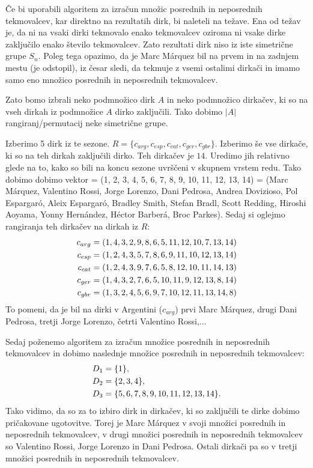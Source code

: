 \documentclass[a4paper, 12pt]{book}
\begin{document}
Če bi uporabili algoritem za izračun množic posrednih in neposrednih tekmovalcev, kar direktno na rezultatih dirk, bi naleteli na težave. Ena od težav je, da ni na vsaki dirki tekmovalo enako tekmovalcev oziroma ni vsake dirke zaključilo enako število tekmovalcev. Zato rezultati dirk niso iz iste simetrične grupe $S_n$. Poleg tega opazimo, da je Marc Márquez bil na prvem in na zadnjem mestu (je odstopil), iz česar sledi, da tekmuje z vsemi ostalimi dirkači in imamo samo eno množico posrednih in neposrednih tekmovalcev.

Zato bomo izbrali neko podmnožico dirk $A$ in neko podmnožico dirkačev, ki so na vseh dirkah iz podmnožice $A$ dirko zaključili. Tako dobimo $|A|$ rangiranj/permutacij neke simetrične grupe.

Izberimo 5 dirk iz te sezone. $R = \{ c_{arg}, c_{esp}, c_{cat}, c_{ger}, c_{gbr} \}$. Izberimo še vse dirkače, ki so na teh dirkah zaključili dirko. Teh dirkačev je $14$. Uredimo jih relativno glede na to, kako so bili na koncu sezone uvrščeni v skupnem vrstem redu. Tako dobimo dobimo vektor = (1, 2, 3, 4, 5, 6, 7, 8, 9, 10, 11, 12, 13, 14) = (Marc Márquez, Valentino Rossi, Jorge Lorenzo, Dani Pedrosa, Andrea Dovizioso, Pol Espargaró, Aleix Espargaró, Bradley Smith, Stefan Bradl, Scott Redding, Hiroshi Aoyama, Yonny Hernández, Héctor Barberá, Broc Parkes). Sedaj si oglejmo rangiranja teh dirkačev na dirkah iz $R$:
\begin{align}
    c_{arg} &= (1, 4, 3, 2, 9, 8, 6, 5, 11, 12, 10, 7, 13, 14) \notag\\
    c_{esp} &= (1, 2, 4, 3, 5, 7, 8, 6, 9, 11, 10, 12, 13, 14) \notag\\
    c_{cat} &= (1, 2, 4, 3, 9, 7, 6, 5, 8, 12, 10, 11, 14, 13) \notag\\
    c_{ger} &= (1, 4, 3, 2, 7, 6, 5, 10, 11, 9, 12, 13, 8, 14) \notag\\
    c_{gbr} &= (1, 3, 2, 4, 5, 6, 9, 7, 10, 12, 11, 13, 14, 8) \notag
\end{align}
To pomeni, da je bil na dirki v Argentini ($c_{arg}$) prvi Marc Márquez, drugi Dani Pedrosa, tretji Jorge Lorenzo, četrti Valentino Rossi,...

Sedaj poženemo algoritem za izračun množice posrednih in neposrednih tekmovalcev in dobimo naslednje množice posrednih in neposrednih tekmovalcev:
\begin{align}
    D_1 &= \{ 1 \},  \notag\\
    D_2 &= \{ 2, 3, 4 \}, \notag\\
    D_3 &= \{ 5, 6, 7, 8, 9, 10, 11, 12, 13, 14 \}. \notag
\end{align}
Tako vidimo, da so za to izbiro dirk in dirkačev, ki so zaključili te dirke dobimo pričakovane ugotovitve. Torej je Marc Márquez v svoji množici posrednih in neposrednih tekmovalcev, v drugi množici posrednih in neposrednih tekmovalcev so Valentino Rossi, Jorge Lorenzo in Dani Pedrosa. Ostali dirkači pa so v tretji množici posrednih in neposrednih tekmovalcev.
\end{document}
